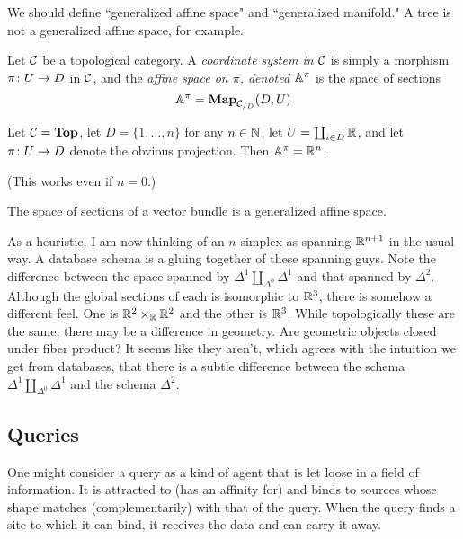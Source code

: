 \documentclass{amsart}
\def\Map{{\bf Map}}
\begin{document}
We should define ``generalized affine space" and ``generalized manifold."  A tree is not a generalized affine space, for example. 

\begin{definition}

Let $\mcC$ be a topological category.  A {\em coordinate system in $\mcC$} is simply a morphism $\pi\taking U\to D$ in $\mcC$, and the {\em affine space on $\pi$, denoted $\AA^\pi$} is the space of sections $$\AA^\pi=\Map_{\mcC_{/D}}(D,U)$$

\end{definition}

\begin{example}

Let $\mcC=\Top$, let $D=\{1,\ldots,n\}$ for any $n\in\NN$, let $U=\coprod_{i\in D}\RR$, and let $\pi\taking U\to D$ denote the obvious projection.  Then $\AA^\pi=\RR^n$.  

(This works even if $n=0$.)

\end{example}

\begin{example}

The space of sections of a vector bundle is a generalized affine space.

\end{example}

As a heuristic, I am now thinking of an $n$ simplex as spanning $\RR^{n+1}$ in the usual way.  A database schema is a gluing together of these spanning guys.  Note the difference between the space spanned by $\Delta^1\amalg_{\Delta^0}\Delta^1$ and that spanned by $\Delta^2$.  Although the global sections of each is isomorphic to $\RR^3$, there is somehow a different feel.  One is $\RR^2\cross_\RR\RR^2$ and the other is $\RR^3$.  While topologically these are the same, there may be a difference in geometry.  Are geometric objects closed under fiber product?  It seems like they aren't, which agrees with the intuition we get from databases, that there is a subtle difference between the schema $\Delta^1\amalg_{\Delta^0}\Delta^1$ and the schema $\Delta^2$.

\subsection{Queries}

One might consider a query as a kind of agent that is let loose in a field of information.  It is attracted to (has an affinity for) and binds to sources whose shape matches (complementarily) with that of the query.  When the query finds a site to which it can bind, it receives the data and can carry it away.  
\end{document}
